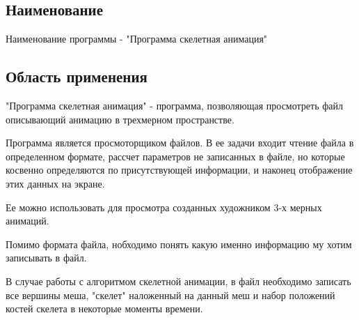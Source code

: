 \subsection{Наименование}
Наименование программы - "Программа скелетная анимация"

\subsection{Область применения}
"Программа скелетная анимация" - программа, позволяющая просмотреть файл описывающий анимацию в трехмерном пространстве. 

Программа является просмоторщиком файлов. В ее задачи входит чтение файла в определенном формате, рассчет параметров не записанных  в файле, но которые косвенно определяются по присутствующей информации, и наконец отображение этих данных на экране. 

Ее можно использовать для просмотра созданных художником 3-х мерных анимаций. 

Помимо формата файла, нобходимо понять какую именно информацию му хотим записывать в файл. 

В случае работы с алгоритмом скелетной анимации, в файл необходимо записать все вершины меша, "скелет" наложенный на данный меш и набор положений костей скелета в некоторые моменты времени.

